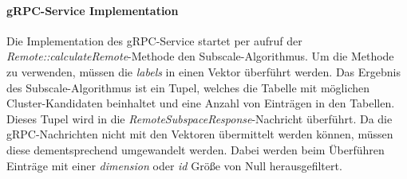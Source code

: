 \paragraph{gRPC-Service Implementation} Die Implementation des gRPC-Service startet per aufruf der \textit{Remote::calculateRemote}-Methode den Subscale-Algorithmus. Um die Methode zu verwenden, müssen die \textit{labels} in einen Vektor überführt werden. Das Ergebnis des Subscale-Algorithmus ist ein Tupel, welches die Tabelle mit möglichen Cluster-Kandidaten beinhaltet und eine Anzahl von Einträgen in den Tabellen. Dieses Tupel wird in die \textit{RemoteSubspaceResponse}-Nachricht überführt. Da die gRPC-Nachrichten nicht mit den Vektoren übermittelt werden können, müssen diese dementsprechend umgewandelt werden. Dabei werden beim Überführen Einträge mit einer \textit{dimension} oder \textit{id} Größe von Null herausgefiltert.
